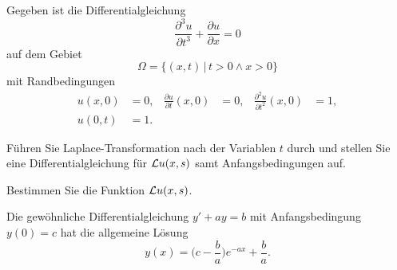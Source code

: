Gegeben ist die Differentialgleichung
\begin{equation}
\frac{\partial^3 u}{\partial t^3}
+
\frac{\partial u}{\partial x}
=
0
\label{50000013:dgl}
\end{equation}
auf dem Gebiet
\[
\Omega = \{ (x,t)\,|\, t>0\wedge x > 0\}
\]
mit Randbedingungen
\begin{equation}
\begin{aligned}
u(x,0)&=0,
&
\frac{\partial u}{\partial t}(x,0)
&=
0,
&
\frac{\partial^2 u}{\partial t^2}(x,0)
&=1,
\\
u(0,t)&=1.
\end{aligned}
\end{equation}
\begin{teilaufgaben}
\item
Führen Sie Laplace-Transformation nach der Variablen $t$ durch und
stellen Sie eine Differentialgleichung für ${\cal L}u(x,s)$ samt
Anfangsbedingungen auf.
\item
Bestimmen Sie die Funktion ${\cal L}u(x,s)$.
\end{teilaufgaben}

\begin{hinweis}
Die gewöhnliche Differentialgleichung $y'+ay=b$ mit Anfangsbedingung $y(0)=c$
hat die allgemeine Lösung
\[
y(x) = \biggl(c-\frac{b}{a}\biggr)e^{-ax} + \frac{b}{a}.
\]
\end{hinweis}

